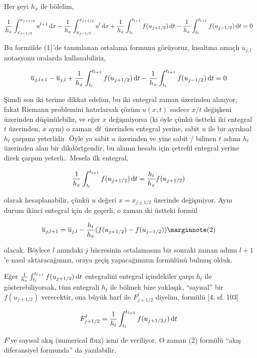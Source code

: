 \documentclass[12pt,fleqn]{article}\usepackage{../../common}
\begin{document}
Her şeyi $h_x$ ile bölelim,

$$
\frac{1}{h_x} \int_{x_{j-1/2}}^{x_{j+1/2}} u^{l+1} \,\mathrm{d} x -
\frac{1}{h_x} \int_{x_{j-1/2}}^{x_{j+1/2}} u^{l} \,\mathrm{d} x  +
\frac{1}{h_x} \int_{t_l}^{t_{l+1}} f(u_{j+1/2}) \,\mathrm{d} t  -
\frac{1}{h_x} \int_{t_l}^{t_{l+1}} f(u_{j-1/2}) \,\mathrm{d} t = 0
$$

Bu formülde (1)'de tanımlanan ortalama formunu görüyoruz, kısaltma amaçlı
$\overline{u}_{j,l}$ notasyonu oralarda kullanabiliriz,

$$
\overline{u}_{j,l+1} - \overline{u}_{j,l} + 
\frac{1}{h_x} \int_{t_l}^{t_{l+1}} f(u_{j+1/2}) \,\mathrm{d} t  -
\frac{1}{h_x} \int_{t_l}^{t_{l+1}} f(u_{j-1/2}) \,\mathrm{d} t = 0
$$

Şimdi son iki terime dikkat edelim, bu iki entegral zaman üzerinden alınıyor,
fakat Riemann problemini hatırlarsak çözüm $u(x,t)$ sadece $x/t$ değişkeni
üzerinden düşünülebilir, ve eğer $x$ değişmiyorsa (ki öyle çünkü üstteki iki
entegral $t$ üzerinden, $x$ aynı) o zaman $\,\mathrm{d} t$ üzerinden entegral yerine,
sabit $u$ ile bir ayrıksal $h_t$ çarpımı yeterlidir. Öyle ya sabit $u$ üzerinden
ve yine sabit / bilinen $t$ adımı $h_t$ üzerinden alan bir dikdörtgendir, bu
alanın hesabı için çetrefil entegral yerine direk çarpım yeterli.. Mesela ilk
entegral,

$$
\frac{1}{h_x} \int_{t_l}^{t_{l+1}} f(u_{j+1/2}) \,\mathrm{d} t =
\frac{h_t}{h_x} f(u_{j+1/2})
$$

olarak hesaplanabilir, çünkü $u$ değeri $x = x_{j \pm 1/2}$ üzerinde değişmiyor.
Aynı durum ikinci entegral için de geçerli, o zaman iki üstteki formül

$$
\overline{u}_{j,l+1} = \overline{u}_{j,l} -
\frac{h_t}{h_x} ( f(u_{j+1/2}) - f(u_{j-1/2}) )
\mlabel{2}
$$

olacak. Böylece $l$ anındaki $j$ hücresinin ortalamasını bir sonraki zaman adımı
$l+1$'e nasıl aktaracağımızı, oraya geçiş yapacağımızın formülünü bulmuş olduk.

Eğer $\frac{1}{h_x} \int_{t_l}^{t_{l+1}} f(u_{j+1/2}) \,\mathrm{d} t$ entegralini
entegral içindekiler çarpı $h_t$ ile gösterebiliyorsak, tüm
entegrali $h_t$ ile bölmek bize yaklaşık, ``sayısal'' bir $f(u_{j+1/2})$
verecektir, ona büyük harf ile $F_{j+1/2}^l$ diyelim, formülü [4, sf. 103]

$$
F_{j+1/2}^l = \frac{1}{h_t} \int_{t_l}^{t_{l+1}} f(u_{j+1/2,l}) \,\mathrm{d} t
$$

$F$'ye sayısal akış (numerical flux) ismi de veriliyor. O zaman (2) formülü
``akış diferansiyel formunda'' da yazılabilir,
\end{document}
